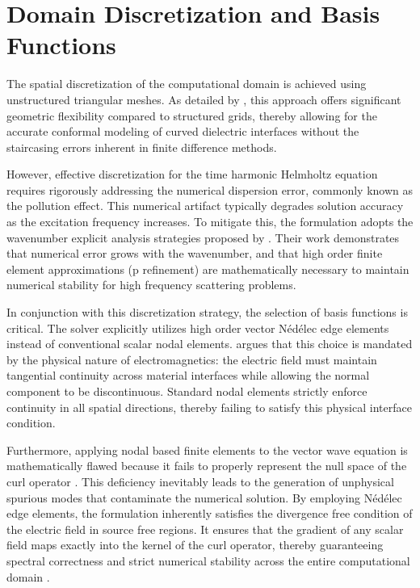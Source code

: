 \section{Domain Discretization and Basis Functions}

The spatial discretization of the computational domain is achieved using unstructured triangular meshes. As detailed by \citet{Esterhazy2013}, this approach offers significant geometric flexibility compared to structured grids, thereby allowing for the accurate conformal modeling of curved dielectric interfaces without the staircasing errors inherent in finite difference methods.

\vspace{12pt}

However, effective discretization for the time harmonic Helmholtz equation requires rigorously addressing the numerical dispersion error, commonly known as the pollution effect. This numerical artifact typically degrades solution accuracy as the excitation frequency increases. To mitigate this, the formulation adopts the wavenumber explicit analysis strategies proposed by \citet{Melenk2010}. Their work demonstrates that numerical error grows with the wavenumber, and that high order finite element approximations (p refinement) are mathematically necessary to maintain numerical stability for high frequency scattering problems.

\vspace{12pt}

In conjunction with this discretization strategy, the selection of basis functions is critical. The solver explicitly utilizes high order vector Nédélec edge elements instead of conventional scalar nodal elements. \citet{Webb1999} argues that this choice is mandated by the physical nature of electromagnetics: the electric field must maintain tangential continuity across material interfaces while allowing the normal component to be discontinuous. Standard nodal elements strictly enforce continuity in all spatial directions, thereby failing to satisfy this physical interface condition.

\vspace{12pt}

Furthermore, applying nodal based finite elements to the vector wave equation is mathematically flawed because it fails to properly represent the null space of the curl operator \citep{Monk1992}. This deficiency inevitably leads to the generation of unphysical spurious modes that contaminate the numerical solution. By employing Nédélec edge elements, the formulation inherently satisfies the divergence free condition of the electric field in source free regions. It ensures that the gradient of any scalar field maps exactly into the kernel of the curl operator, thereby guaranteeing spectral correctness and strict numerical stability across the entire computational domain \citep{Nedelec1980}.

